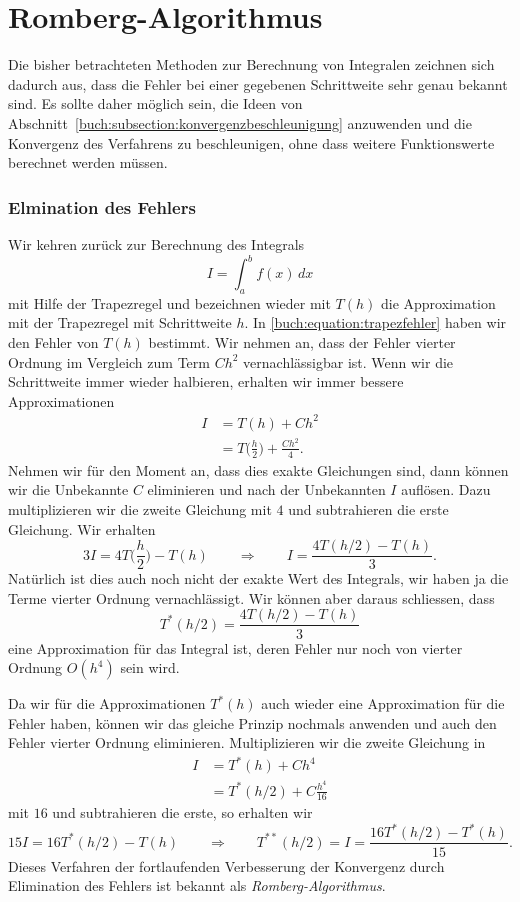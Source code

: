 %
%
%
\section{Romberg-Algorithmus
\label{buch:section:romberg}}
%
Die bisher betrachteten Methoden zur Berechnung von Integralen zeichnen
sich dadurch aus, dass die Fehler bei einer gegebenen Schrittweite 
sehr genau bekannt sind.
Es sollte daher möglich sein, die Ideen von
Abschnitt~\ref{buch:subsection:konvergenzbeschleunigung}
anzuwenden und die Konvergenz des Verfahrens zu beschleunigen, ohne
dass weitere Funktionswerte berechnet werden müssen.

\subsubsection{Elmination des Fehlers}
%
%
Wir kehren zurück zur Berechnung des Integrals
%
\[
I=\int_a^b f(x)\,dx
\]
mit Hilfe der Trapezregel und bezeichnen wieder mit $T(h)$
die Approximation mit der Trapezregel mit Schrittweite $h$.
%
%
In \eqref{buch:equation:trapezfehler} haben wir den Fehler von $T(h)$
bestimmt.
Wir nehmen an, dass der Fehler vierter Ordnung im Vergleich zum Term
$Ch^2$ vernachlässigbar ist.
Wenn wir die Schrittweite immer wieder halbieren, erhalten wir immer bessere
Approximationen
%
%
\begin{align*}
I&=T(h) + Ch^2
\\
&=T\biggl(\frac{h}2\biggr) + \frac{Ch^2}{4}.
\end{align*}
Nehmen wir für den Moment an, dass dies exakte Gleichungen sind, dann
können wir die Unbekannte $C$ eliminieren und nach der Unbekannten $I$
auflösen.
Dazu multiplizieren wir die zweite Gleichung mit $4$ und subtrahieren
die erste Gleichung.
Wir erhalten
\[
3I= 4T\biggl(\frac{h}2\biggr) - T(h)
\qquad\Rightarrow\qquad
I= \frac{4T(h/2) - T(h)}{3}.
\]
Natürlich ist dies auch noch nicht der exakte Wert des Integrals,
wir haben ja die Terme vierter Ordnung vernachlässigt.
Wir können aber daraus schliessen, dass 
\[
T^*(h/2) = \frac{4T(h/2)-T(h)}{3}
\]
eine Approximation für das Integral ist, deren Fehler nur noch
von vierter Ordnung $O(h^4)$ sein wird.

Da wir für die Approximationen $T^*(h)$ auch wieder eine Approximation
für die Fehler haben, können wir das gleiche Prinzip nochmals anwenden
und auch den Fehler vierter Ordnung eliminieren.
Multiplizieren wir die zweite Gleichung in
\begin{align*}
I&=T^*(h) + Ch^4 \\
 &=T^*(h/2) + C\frac{h^4}{16}
\end{align*}
mit $16$ und subtrahieren die erste, so erhalten wir
\[
15I = 16T^*(h/2)-T(h)
\qquad\Rightarrow\qquad
T^{**}(h/2) = I = \frac{16T^*(h/2)-T^*(h)}{15}.
\]
Dieses Verfahren der fortlaufenden Verbesserung der Konvergenz durch
Elimination des Fehlers ist bekannt als {\em Romberg-Algorithmus}.
%
%


